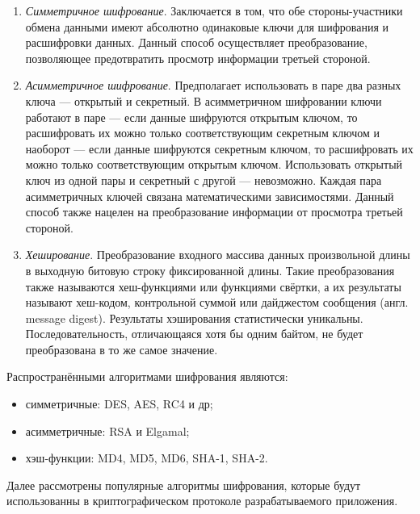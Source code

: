 \begin{enumerate}
	\item \emph{Симметричное шифрование}. Заключается в том, что обе стороны-участники обмена данными имеют абсолютно одинаковые ключи для шифрования и расшифровки данных. Данный способ осуществляет преобразование, позволяющее предотвратить просмотр информации третьей стороной.
	\item \emph{Асимметричное шифрование}. Предполагает использовать в паре два разных ключа — открытый и секретный. В асимметричном шифровании ключи работают в паре — если данные шифруются открытым ключом, то расшифровать их можно только соответствующим секретным ключом и наоборот — если данные шифруются секретным ключом, то расшифровать их можно только соответствующим открытым ключом. Использовать открытый ключ из одной пары и секретный с другой — невозможно. Каждая пара асимметричных ключей связана математическими зависимостями. Данный способ также нацелен на преобразование информации от просмотра третьей стороной.
	\item \emph{Хеширование}. Преобразование входного массива данных произвольной длины в выходную битовую строку фиксированной длины. Такие преобразования также называются хеш-функциями или функциями свёртки, а их результаты называют хеш-кодом, контрольной суммой или дайджестом сообщения (англ. message digest). Результаты хэширования статистически уникальны. Последовательность, отличающаяся хотя бы одним байтом, не будет преобразована в то же самое значение.
\end{enumerate}

Распространёнными алгоритмами шифрования являются:

\begin{itemize}
	\item симметричные: DES, AES, RC4 и др;
	\item асимметричные: RSA и Elgamal;
	\item хэш-функции: MD4, MD5, MD6, SHA-1, SHA-2.
\end{itemize}

Далее рассмотрены популярные алгоритмы шифрования, которые будут использованны в криптографическом протоколе разрабатываемого приложения.